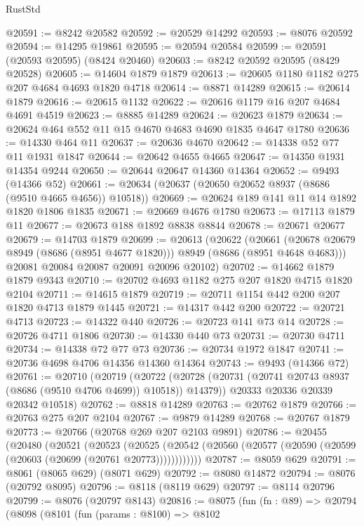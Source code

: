 \begin{lexlean}{RustStd}
\begin{coremodule}
@20591 := @8242 @20582
@20592 := @20529 @14292
@20593 := @8076 @20592
@20594 := @14295 @19861
@20595 := @20594 @20584
@20599 := @20591 (@20593 @20595) (@8424 @20460)
@20603 := @8242 @20592 @20595 (@8429 @20528)
@20605 := @14604 @1879 @1879
@20613 := @20605 @1180 @1182 @275 @207 @4684 @4693 @1820 @4718
@20614 := @8871 @14289
@20615 := @20614 @1879
@20616 := @20615 @1132
@20622 := @20616 @1179 @16 @207 @4684 @4691 @4519
@20623 := @8885 @14289
@20624 := @20623 @1879
@20634 := @20624 @464 @552 @11 @15 @4670 @4683 @4690 @1835 @4647 @1780
@20636 := @14330 @464 @11
@20637 := @20636 @4670
@20642 := @14338 @52 @77 @11 @1931 @1847
@20644 := @20642 @4655 @4665
@20647 := @14350 @1931 @14354 @9244
@20650 := @20644 @20647 @14360 @14364
@20652 := @9493 (@14366 @52)
@20661 := @20634 (@20637 (@20650 @20652 @8937 (@8686 (@9510 @4665 @4656)) @10518))
@20669 := @20624 @189 @141 @11 @14 @1892 @1820 @1806 @1835
@20671 := @20669 @4676 @1780
@20673 := @17113 @1879 @11
@20677 := @20673 @188 @1892 @8838 @8844
@20678 := @20671 @20677
@20679 := @14703 @1879
@20699 := @20613
    (@20622
      (@20661 (@20678 @20679 @8949 (@8686 (@8951 @4677 @1820))) @8949 (@8686 (@8951 @4648 @4683)))
      @20081
      @20084
      @20087
      @20091
      @20096
      @20102)
@20702 := @14662 @1879 @1879 @9343
@20710 := @20702 @4693 @1182 @275 @207 @1820 @4715 @1820 @2104
@20711 := @14615 @1879
@20719 := @20711 @1154 @442 @200 @207 @1820 @4713 @1879 @1445
@20721 := @14317 @442 @200
@20722 := @20721 @4713
@20723 := @14322 @440
@20726 := @20723 @141 @73 @14
@20728 := @20726 @4711 @1806
@20730 := @14330 @440 @73
@20731 := @20730 @4711
@20734 := @14338 @72 @77 @73
@20736 := @20734 @1972 @1847
@20741 := @20736 @4698 @4706 @14356 @14360 @14364
@20743 := @9493 (@14366 @72)
@20761 := @20710
    (@20719
      (@20722 (@20728 (@20731 (@20741 @20743 @8937 (@8686 (@9510 @4706 @4699)) @10518)) @14379))
      @20333
      @20336
      @20339
      @20342
      @10518)
@20762 := @8818 @14289
@20763 := @20762 @1879
@20766 := @20763 @275 @207 @2104
@20767 := @9879 @14289
@20768 := @20767 @1879
@20773 := @20766 (@20768 @269 @207 @2103 @9891)
@20786 := @20455
    (@20480
      (@20521
        (@20523
          (@20525 (@20542 (@20560 (@20577 (@20590 (@20599 (@20603 (@20699 (@20761 @20773))))))))))))
@20787 := @8059 @629
@20791 := @8061 (@8065 @629) (@8071 @629)
@20792 := @8080 @14872
@20794 := @8076 (@20792 @8095)
@20796 := @8118 (@8119 @629)
@20797 := @8114 @20796
@20799 := @8076 (@20797 @8143)
@20816 := @8075
    (fun (fn : @89) =>
    @20794
      (@8098
        (@8101
          (fun (params : @8100) =>
          @8102

\end{coremodule}
\end{lexlean}
